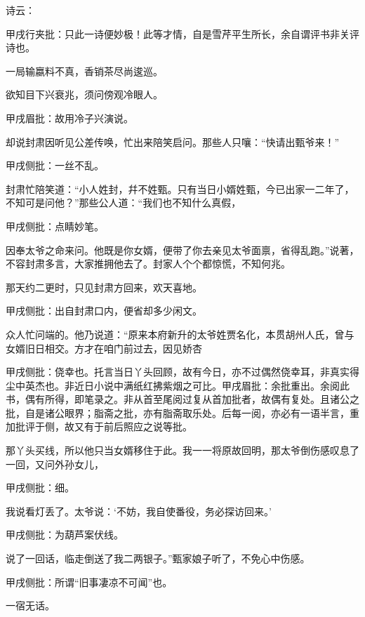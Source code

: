 \begin{parag}
    诗云：\begin{note}甲戌行夹批：只此一诗便妙极！此等才情，自是雪芹平生所长，余自谓评书非关评诗也。\end{note}
\end{parag}


\begin{poem}

    \begin{pl}
        一局输嬴料不真，香销茶尽尚逡巡。\end{pl}

    \begin{pl}
        欲知目下兴衰兆，须问傍观冷眼人。\end{pl}\begin{note}甲戌眉批：故用冷子兴演说。\end{note}
\end{poem}


\begin{parag}
    却说封肃因听见公差传唤，忙出来陪笑启问。那些人只嚷：“快请出甄爷来！”\begin{note}甲戌侧批：一丝不乱。\end{note}封肃忙陪笑道：“小人姓封，幷不姓甄。只有当日小婿姓甄，今已出家一二年了，不知可是问他？”那些公人道：“我们也不知什么真假，\begin{note}甲戌侧批：点睛妙笔。\end{note}因奉太爷之命来问。他既是你女婿，便带了你去亲见太爷面禀，省得乱跑。”说著，不容封肃多言，大家推拥他去了。封家人个个都惊慌，不知何兆。
\end{parag}


\begin{parag}
    那天约二更时，只见封肃方回来，欢天喜地。\begin{note}甲戌侧批：出自封肃口内，便省却多少闲文。\end{note}众人忙问端的。他乃说道：“原来本府新升的太爷姓贾名化，本贯胡州人氏，曾与女婿旧日相交。方才在咱门前过去，因见娇杏\begin{note}甲戌侧批：侥幸也。托言当日丫头回顾，故有今日，亦不过偶然侥幸耳，非真实得尘中英杰也。非近日小说中满纸红拂紫烟之可比。甲戌眉批：余批重出。余阅此书，偶有所得，即笔录之。非从首至尾阅过复从首加批者，故偶有复处。且诸公之批，自是诸公眼界；脂斋之批，亦有脂斋取乐处。后每一阅，亦必有一语半言，重加批评于侧，故又有于前后照应之说等批。\end{note}那丫头买线，所以他只当女婿移住于此。我一一将原故回明，那太爷倒伤感叹息了一回，又问外孙女儿，\begin{note}甲戌侧批：细。\end{note}我说看灯丢了。太爷说：‘不妨，我自使番役，务必探访回来。’\begin{note}甲戌侧批：为葫芦案伏线。\end{note}说了一回话，临走倒送了我二两银子。”甄家娘子听了，不免心中伤感。\begin{note}甲戌侧批：所谓“旧事凄凉不可闻”也。\end{note}一宿无话。
\end{parag}


